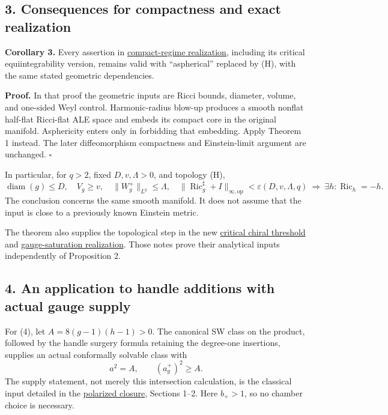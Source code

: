\documentclass[
  11pt,
]{article}
\begin{document}
\hypertarget{consequences-for-compactness-and-exact-realization}{%
\subsection{3. Consequences for compactness and exact
realization}\label{consequences-for-compactness-and-exact-realization}}

\textbf{Corollary 3.} Every assertion in
\href{20260923_compact_realization.md}{compact-regime realization},
including its critical equiintegrability version, remains valid with
``aspherical'' replaced by (H), with the same stated geometric
dependencies.

\textbf{Proof.} In that proof the geometric inputs are Ricci bounds,
diameter, volume, and one-sided Weyl control. Harmonic-radius blow-up
produces a smooth nonflat half-flat Ricci-flat ALE space and embeds its
compact core in the original manifold. Asphericity enters only in
forbidding that embedding. Apply Theorem 1 instead. The later
diffeomorphism compactness and Einstein-limit argument are unchanged.
\(\square\)

In particular, for \(q>2\), fixed \(D,v,\Lambda>0\), and topology (H),
\[
 \operatorname{diam}(g)\le D,\quad V_g\ge v,\quad
 \|W_g^+\|_{L^q}\le\Lambda,\quad
 \|\operatorname{Ric}^{\sharp}_g+I\|_{\infty,\mathrm{op}}
       <\varepsilon(D,v,\Lambda,q)
 \ \Longrightarrow\ \exists h:\operatorname{Ric}_h=-h.
 \tag{5}
\] The conclusion concerns the same smooth manifold. It does not assume
that the input is close to a previously known Einstein metric.

The theorem also supplies the topological step in the new
\href{20260923_critical_chiral_threshold.md}{critical chiral threshold}
and \href{20260923_gauge_saturation_ke.md}{gauge-saturation
realization}. Those notes prove their analytical inputs independently of
Proposition 2.

\hypertarget{an-application-to-handle-additions-with-actual-gauge-supply}{%
\subsection{4. An application to handle additions with actual gauge
supply}\label{an-application-to-handle-additions-with-actual-gauge-supply}}

For (4), let \(A=8(g-1)(h-1)>0\). The canonical SW class on the product,
followed by the handle surgery formula retaining the degree-one
insertions, supplies an actual conformally solvable class with \[
 a^2=A,\qquad (a_g^+)^2\ge A.
 \tag{6}
\] The supply statement, not merely this intersection calculation, is
the classical input detailed in the
\href{../mathematics/current/lebrun_stability_closure.md}{polarized
closure}, Sections 1--2. Here \(b_+>1\), so no chamber choice is
necessary.
\end{document}
